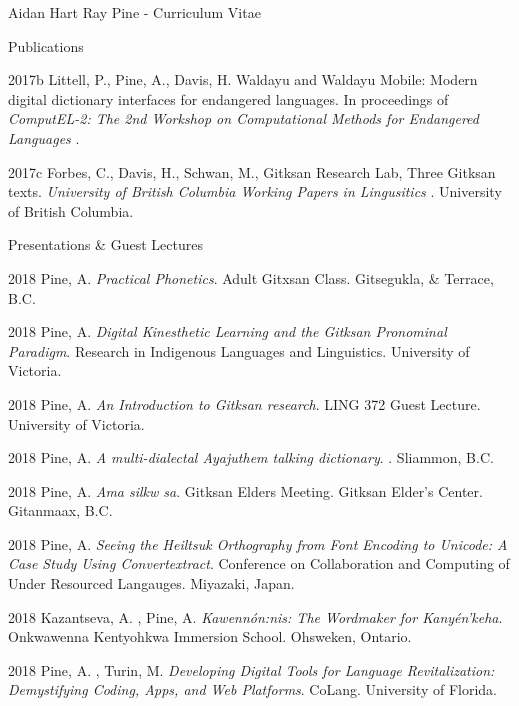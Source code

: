 \documentclass[12pt]{letter}
\begin{document}
\begin{cv}{ Aidan Hart Ray Pine  \space - \space   Curriculum Vitae}
\begin{cvlist}{Publications}
                                                                                \item[2017b] Littell, P., Pine, A., Davis, H.  Waldayu and Waldayu Mobile: Modern digital dictionary interfaces for endangered languages. In proceedings of \textit{ ComputEL-2: The 2nd Workshop on Computational Methods for Endangered Languages }.  
                                                                                \item[2017c]  Forbes,  C.,  Davis,  H.,  Schwan,  M.,  Gitksan Research Lab,   Three Gitksan texts. \textit{ University of British Columbia Working Papers in Lingusitics }.  University of British Columbia.  
                                                        \end{cvlist}

        \begin{cvlist}{Presentations \& Guest Lectures}
                    \item[2018]  Pine,  A.   \textit{Practical Phonetics}. Adult Gitxsan Class. Gitsegukla, \& Terrace, B.C.  
                    \item[2018]  Pine,  A.   \textit{Digital Kinesthetic Learning and the Gitksan Pronominal Paradigm}. Research in Indigenous Languages and Linguistics. University of Victoria.  
                    \item[2018]  Pine,  A.   \textit{An Introduction to Gitksan research}. LING 372 Guest Lecture. University of Victoria.  
                    \item[2018]  Pine,  A.   \textit{A multi-dialectal Ayajuthem talking dictionary}. . Sliammon, B.C.  
                    \item[2018]  Pine,  A.   \textit{Ama silkw sa}. Gitksan Elders Meeting. Gitksan Elder's Center. Gitanmaax, B.C.  
                    \item[2018]  Pine,  A.   \textit{Seeing the Heiltsuk Orthography from Font Encoding to Unicode: A Case Study Using Convertextract}. Conference on Collaboration and Computing of Under Resourced Langauges. Miyazaki, Japan.  
                    \item[2018]  Kazantseva,  A. ,  Pine,  A.   \textit{Kawenn{\'o}n:nis: The Wordmaker for Kany{\'e}n'keha}. Onkwawenna Kentyohkwa Immersion School. Ohsweken, Ontario.  
                    \item[2018]  Pine,  A. ,  Turin,  M.   \textit{Developing Digital Tools for Language Revitalization: Demystifying Coding, Apps, and Web Platforms}. CoLang. University of Florida.  

\end{cvlist}
\end{cv}
\end{document}
